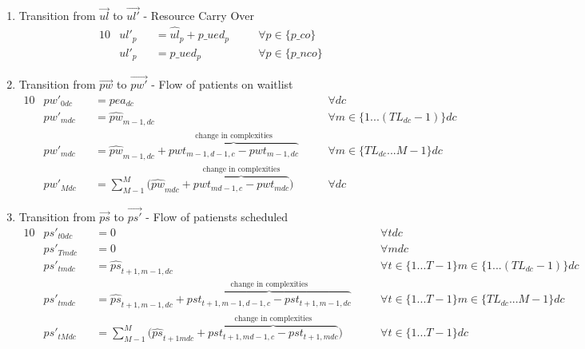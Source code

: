 \begin{enumerate}
	\item Transition from $\vec{ul}$ to $\vec{ul'}$ - Resource Carry Over
	\begin{alignat}{10}
		& ul'_{p} 
		&& = \hat{ul}_{p} + p\_ued_{p} \quad 
		&& \forall p \in \{ p\_co \} \\
		& ul'_{p} 
		&& = p\_ued_{p} \quad 
		&& \forall p \in \{ p\_nco \} 
	\end{alignat} 
	
	
	\item Transition from $\vec{pw}$ to $\vec{pw'}$ - Flow of patients on waitlist
	\begin{alignat}{10}
		& pw'_{0dc} 
		&& = pea_{dc} \quad
		&& \forall dc \\  
		& pw'_{mdc} 
		&& = \hat{pw}_{m-1,dc}
		&& \forall m \in \{ 1...(TL_{dc}-1) \} dc \\  
		& pw'_{mdc} 
		&& = \hat{pw}_{m-1,dc} + 
		\overbrace{pwt_{m-1,d-1,c} - pwt_{m-1,dc}}^\text{
			change in complexities} \quad
		&& \forall m \in \{ TL_{dc}...M-1 \} dc \\  
		& pw'_{Mdc} 
		&& = \sum_{M-1}^{M} \big( 
		\hat{pw}_{mdc} + 
		\overbrace{pwt_{md-1,c} - pwt_{mdc}}^\text{
			change in complexities} \big) \quad
		&& \forall dc
	\end{alignat}
	
	
	\item Transition from $\vec{ps}$ to $\vec{ps'}$ - Flow of patiensts scheduled
	\begin{alignat}{10}
		& ps'_{t0dc} 
		&& = 0 \quad
		&& \forall tdc \\  
		& ps'_{Tmdc} 
		&& = 0 \quad
		&& \forall mdc \\  
		& ps'_{tmdc} 
		&& = \hat{ps}_{t+1,m-1,dc} \quad 
		&& \forall t \in \{1...T-1\} m \in \{ 1... (TL_{dc}-1) \} dc \\ 
		& ps'_{tmdc} 
		&& = \hat{ps}_{t+1,m-1,dc} + 
		\overbrace{pst_{t+1,m-1,d-1,c} - pst_{t+1,m-1,dc}}^\text{
			change in complexities} \quad
		&& \forall t \in \{1...T-1\} m \in \{ TL_{dc}...M-1 \} dc \\  
		& ps'_{tMdc} 
		&& = \sum_{M-1}^{M} \big( 
		\hat{ps}_{t+1mdc} + 
		\overbrace{pst_{t+1,md-1,c} - pst_{t+1,mdc}}^\text{
			change in complexities} \big) \quad
		&& \forall t \in \{1...T-1\} dc
	\end{alignat}
\end{enumerate}

